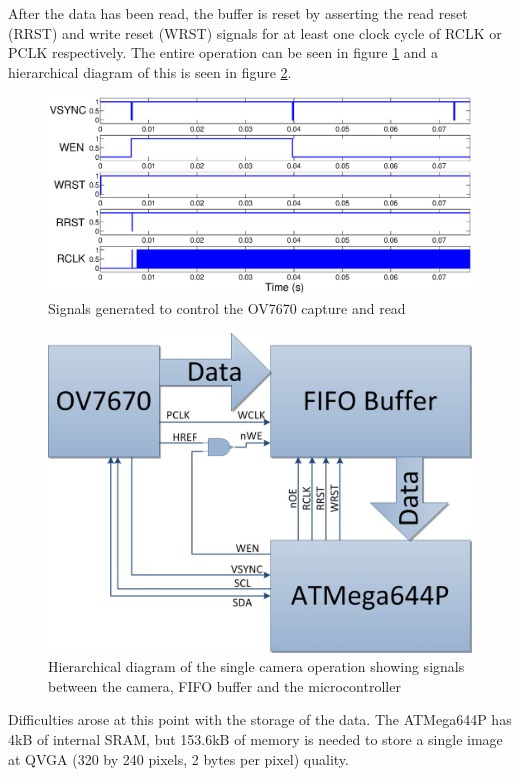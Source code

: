 After the data has been read, the buffer is reset by asserting the read reset (RRST) and write reset (WRST) signals for at least one clock cycle of RCLK or PCLK respectively. The entire operation can be seen in figure \ref{fig:ov_Capture} and a hierarchical diagram of this is seen in figure \ref{fig:cam:heir}.
\begin{figure}
\includegraphics[width = \textwidth - 3cm]{./Figures/ov7670_im_capture.eps}
\caption{Signals generated to control the OV7670 capture and read}
\label{fig:ov_Capture}
\end{figure}
\begin{figure}
\includegraphics[width=\textwidth]{./Figures/Camera_Hierarchy.jpg}
\caption{Hierarchical diagram of the single camera operation showing signals between the camera, FIFO buffer and the microcontroller}
\label{fig:cam:heir}
\end{figure}

Difficulties arose at this point with the storage of the data. The ATMega644P has 4kB of internal SRAM, but  153.6kB of memory is needed to store a single image at QVGA (320 by 240 pixels, 2 bytes per pixel) quality. 


